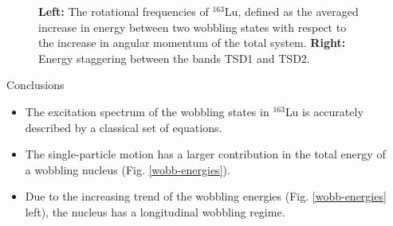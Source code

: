 \documentclass[final]{beamer}
\newlength{\sepwidth}
\newlength{\colwidth}
\newcommand{\separatorcolumn}{\begin{column}{\sepwidth}\end{column}}
\begin{document}
\begin{frame}[t]
\begin{columns}[t]
\begin{column}{\colwidth}
\begin{figure}
\begin{minipage}{.3\textwidth}
\end{minipage}
    \caption{\textbf{Left:} The rotational frequencies of $^{163}$Lu, defined as the averaged increase in energy between two wobbling states with respect to the increase in angular momentum of the total system. \textbf{Right:} Energy staggering between the bands TSD1 and TSD2.}
    \label{rotational-freqs}
\end{figure}
    \begin{block}{Conclusions}
\begin{itemize}
    \item The excitation spectrum of the wobbling states in $^{163}$Lu is accurately described by a classical set of equations.
    \item The single-particle motion has a larger contribution in the total energy of a wobbling nucleus (Fig. \ref{wobb-energies}).
    \item Due to the increasing trend of the wobbling energies (Fig. \ref{wobb-energies} left), the nucleus has a longitudinal wobbling regime.
\end{itemize}
  \end{block}


\end{column}

\separatorcolumn

\end{columns}

\end{frame}
\end{document}
